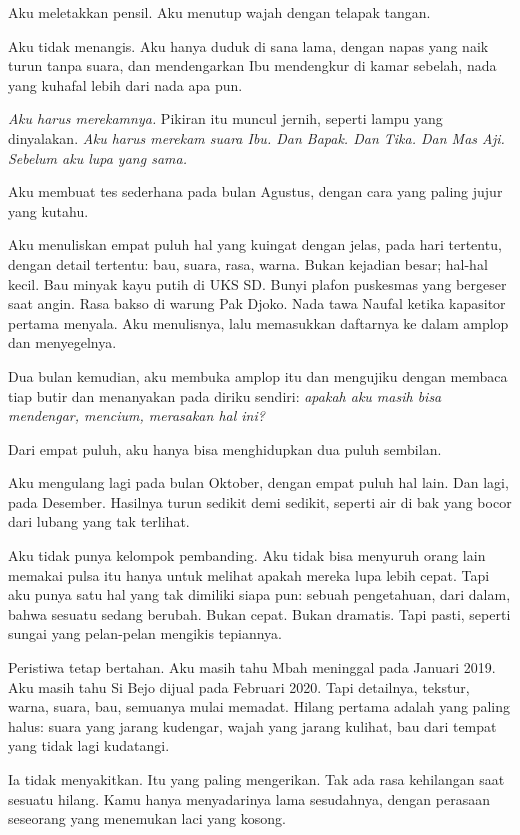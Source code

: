 \documentclass[11pt,twoside,openany]{book}
\makeatletter
\newcommand{\scenebreak}{\par\vspace{0.9em}{\centering\textsc{*\hspace{0.7em}*\hspace{0.7em}*}\par}\vspace{0.9em}\@afterindentfalse\@afterheading}
\makeatother
\begin{document}
Aku meletakkan pensil. Aku menutup wajah dengan telapak tangan.

Aku tidak menangis. Aku hanya duduk di sana lama, dengan napas yang naik turun tanpa suara, dan mendengarkan Ibu mendengkur di kamar sebelah, nada yang kuhafal lebih dari nada apa pun.

\emph{Aku harus merekamnya.} Pikiran itu muncul jernih, seperti lampu yang dinyalakan. \emph{Aku harus merekam suara Ibu. Dan Bapak. Dan Tika. Dan Mas Aji. Sebelum aku lupa yang sama.}

\scenebreak
Aku membuat tes sederhana pada bulan Agustus, dengan cara yang paling jujur yang kutahu.

Aku menuliskan empat puluh hal yang kuingat dengan jelas, pada hari tertentu, dengan detail tertentu: bau, suara, rasa, warna. Bukan kejadian besar; hal-hal kecil. Bau minyak kayu putih di UKS SD. Bunyi plafon puskesmas yang bergeser saat angin. Rasa bakso di warung Pak Djoko. Nada tawa Naufal ketika kapasitor pertama menyala. Aku menulisnya, lalu memasukkan daftarnya ke dalam amplop dan menyegelnya.

Dua bulan kemudian, aku membuka amplop itu dan mengujiku dengan membaca tiap butir dan menanyakan pada diriku sendiri: \emph{apakah aku masih bisa mendengar, mencium, merasakan hal ini?}

Dari empat puluh, aku hanya bisa menghidupkan dua puluh sembilan.

Aku mengulang lagi pada bulan Oktober, dengan empat puluh hal lain. Dan lagi, pada Desember. Hasilnya turun sedikit demi sedikit, seperti air di bak yang bocor dari lubang yang tak terlihat.

Aku tidak punya kelompok pembanding. Aku tidak bisa menyuruh orang lain memakai pulsa itu hanya untuk melihat apakah mereka lupa lebih cepat. Tapi aku punya satu hal yang tak dimiliki siapa pun: sebuah pengetahuan, dari dalam, bahwa sesuatu sedang berubah. Bukan cepat. Bukan dramatis. Tapi pasti, seperti sungai yang pelan-pelan mengikis tepiannya.

Peristiwa tetap bertahan. Aku masih tahu Mbah meninggal pada Januari 2019. Aku masih tahu Si Bejo dijual pada Februari 2020. Tapi detailnya, tekstur, warna, suara, bau, semuanya mulai memadat. Hilang pertama adalah yang paling halus: suara yang jarang kudengar, wajah yang jarang kulihat, bau dari tempat yang tidak lagi kudatangi.

Ia tidak menyakitkan. Itu yang paling mengerikan. Tak ada rasa kehilangan saat sesuatu hilang. Kamu hanya menyadarinya lama sesudahnya, dengan perasaan seseorang yang menemukan laci yang kosong.
\end{document}
